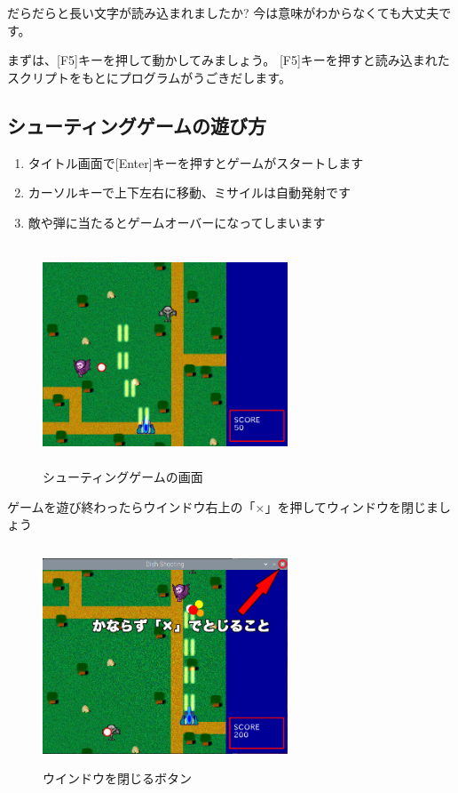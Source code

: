 だらだらと長い文字が読み込まれましたか?
今は意味がわからなくても大丈夫です。

まずは、[F5]キーを押して動かしてみましょう。
[F5]キーを押すと読み込まれたスクリプトをもとにプログラムがうごきだします。
\clearpage

% 
% 
% 
\subsection{シューティングゲームの遊び方}

\begin{enumerate}
  \item タイトル画面で[Enter]キーを押すとゲームがスタートします
  \item カーソルキーで上下左右に移動、ミサイルは自動発射です
  \item 敵や弾に当たるとゲームオーバーになってしまいます
\end{enumerate}

\begin{figure}[H]
  \begin{center}
    \includegraphics[keepaspectratio,width=7.31cm,height=6.562cm]{images/chap02/s_shoot.png}
    \caption{シューティングゲームの画面}
  \end{center}
  \label{fig:hsp_shoot}
\end{figure}

ゲームを遊び終わったらウインドウ右上の「×」を押してウィンドウを閉じましょう

\begin{figure}[H]
  \begin{center}
    \includegraphics[keepaspectratio,width=7.31cm,height=6.562cm]{images/chap02/s_shoot2.png}
    \caption{ウインドウを閉じるボタン}
  \end{center}
  \label{fig:hsp_shoot2}
\end{figure}

